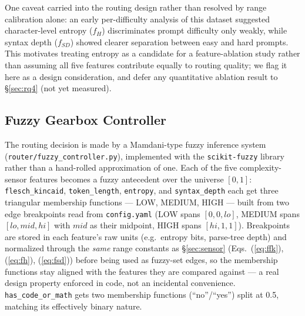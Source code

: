 \documentclass[conference]{IEEEtran}
\begin{document}
One caveat carried into the routing design rather than resolved by range
calibration alone: an early per-difficulty analysis of this dataset
suggested character-level entropy ($f_H$) discriminates prompt difficulty
only weakly, while syntax depth ($f_{SD}$) showed clearer separation
between easy and hard prompts. This motivates treating entropy as a
candidate for a feature-ablation study rather than assuming all five
features contribute equally to routing quality; we flag it here as a
design consideration, and defer any quantitative ablation result to
\S\ref{sec:rq4} (not yet measured).

\subsection{Fuzzy Gearbox Controller}
\label{sec:fuzzy}

The routing decision is made by a Mamdani-type fuzzy inference system
(\texttt{router/fuzzy\_controller.py}), implemented with the
\texttt{scikit-fuzzy} library rather than a hand-rolled approximation of
one. Each of the five complexity-sensor features becomes a fuzzy
antecedent over the universe $[0,1]$: \texttt{flesch\_kincaid},
\texttt{token\_length}, \texttt{entropy}, and \texttt{syntax\_depth} each
get three triangular membership functions --- LOW, MEDIUM, HIGH --- built
from two edge breakpoints read from \texttt{config.yaml} (LOW spans
$[0,0,lo]$, MEDIUM spans $[lo, mid, hi]$ with $mid$ as their midpoint,
HIGH spans $[hi,1,1]$). Breakpoints are stored in each feature's raw
units (e.g.\ entropy bits, parse-tree depth) and normalized through the
\emph{same} range constants as \S\ref{sec:sensor}
(Eqs.~(\ref{eq:ffk}), (\ref{eq:fh}), (\ref{eq:fsd})) before being used as
fuzzy-set edges, so the membership functions stay aligned with the
features they are compared against --- a real design property enforced
in code, not an incidental convenience. \texttt{has\_code\_or\_math} gets
two membership functions (``no''/``yes'') split at 0.5, matching its
effectively binary nature.
\end{document}
